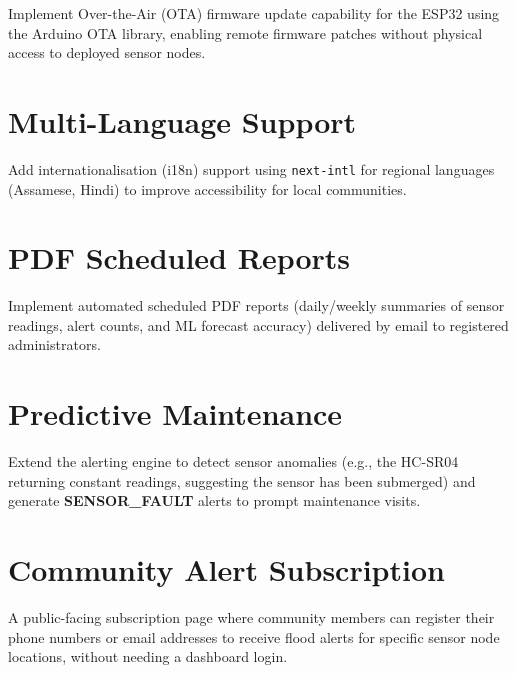 Implement Over-the-Air (OTA) firmware update capability for the ESP32 using the Arduino OTA library, enabling remote firmware patches without physical access to deployed sensor nodes.

\section{Multi-Language Support}

Add internationalisation (i18n) support using \texttt{next-intl} for regional languages (Assamese, Hindi) to improve accessibility for local communities.

\section{PDF Scheduled Reports}

Implement automated scheduled PDF reports (daily/weekly summaries of sensor readings, alert counts, and ML forecast accuracy) delivered by email to registered administrators.

\section{Predictive Maintenance}

Extend the alerting engine to detect sensor anomalies (e.g., the HC-SR04 returning constant readings, suggesting the sensor has been submerged) and generate \textbf{SENSOR\_FAULT} alerts to prompt maintenance visits.

\section{Community Alert Subscription}

A public-facing subscription page where community members can register their phone numbers or email addresses to receive flood alerts for specific sensor node locations, without needing a dashboard login.
